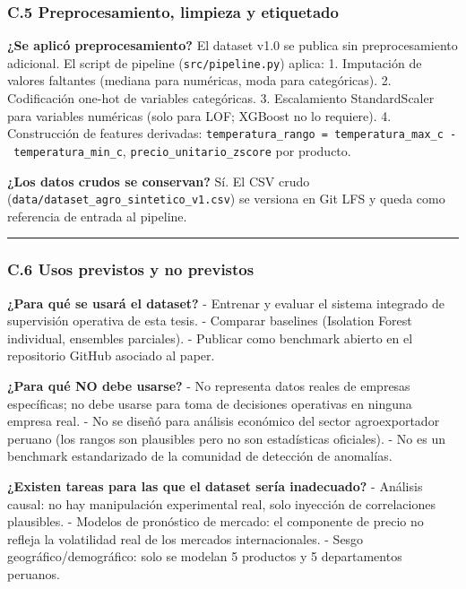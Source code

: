 \subsubsection{C.5 Preprocesamiento, limpieza y
etiquetado}\label{c.5-preprocesamiento-limpieza-y-etiquetado}

\textbf{¿Se aplicó preprocesamiento?} El dataset v1.0 se publica sin
preprocesamiento adicional. El script de pipeline
(\texttt{src/pipeline.py}) aplica: 1. Imputación de valores faltantes
(mediana para numéricas, moda para categóricas). 2. Codificación one-hot
de variables categóricas. 3. Escalamiento StandardScaler para variables
numéricas (solo para LOF; XGBoost no lo requiere). 4. Construcción de
features derivadas:
\texttt{temperatura\_rango\ =\ temperatura\_max\_c\ -\ temperatura\_min\_c},
\texttt{precio\_unitario\_zscore} por producto.

\textbf{¿Los datos crudos se conservan?} Sí. El CSV crudo
(\texttt{data/dataset\_agro\_sintetico\_v1.csv}) se versiona en Git LFS
y queda como referencia de entrada al pipeline.

\begin{center}\rule{0.5\linewidth}{0.5pt}\end{center}

\subsubsection{C.6 Usos previstos y no
previstos}\label{c.6-usos-previstos-y-no-previstos}

\textbf{¿Para qué se usará el dataset?} - Entrenar y evaluar el sistema
integrado de supervisión operativa de esta tesis. - Comparar baselines
(Isolation Forest individual, ensembles parciales). - Publicar como
benchmark abierto en el repositorio GitHub asociado al paper.

\textbf{¿Para qué NO debe usarse?} - No representa datos reales de
empresas específicas; no debe usarse para toma de decisiones operativas
en ninguna empresa real. - No se diseñó para análisis económico del
sector agroexportador peruano (los rangos son plausibles pero no son
estadísticas oficiales). - No es un benchmark estandarizado de la
comunidad de detección de anomalías.

\textbf{¿Existen tareas para las que el dataset sería inadecuado?} -
Análisis causal: no hay manipulación experimental real, solo inyección
de correlaciones plausibles. - Modelos de pronóstico de mercado: el
componente de precio no refleja la volatilidad real de los mercados
internacionales. - Sesgo geográfico/demográfico: solo se modelan 5
productos y 5 departamentos peruanos.

